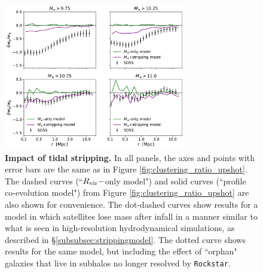 \documentclass[usenatbib,usegraphicx,letterpaper]{mn2e}
\newcommand{\rvir}{R_{\rm vir}}
\begin{document}
\begin{figure}
\centering
\includegraphics[width=8cm]{FIGS/alt_model_wp_ratios.pdf}
\caption{
{\bf Impact of tidal stripping.} 
In all panels, the axes and points with error bars are the same as in Figure \ref{fig:clustering_ratio_upshot}. The dashed curves (``$\rvir-$only model") and solid curves (``profile co-evolution model") from  Figure \ref{fig:clustering_ratio_upshot} are also shown for convenience. The dot-dashed curves show results for a model in which satellites lose mass after infall in a manner similar to what is seen in high-resolution hydrodynamical simulations, as described in \S\ref{subsubsec:strippingmodel}. The dotted curve shows results for the same model, but including the effect of ``orphan" galaxies that live in subhalos no longer resolved by {\tt Rockstar}.
}
\label{fig:strippingorphans}
\end{figure}

\end{document}
